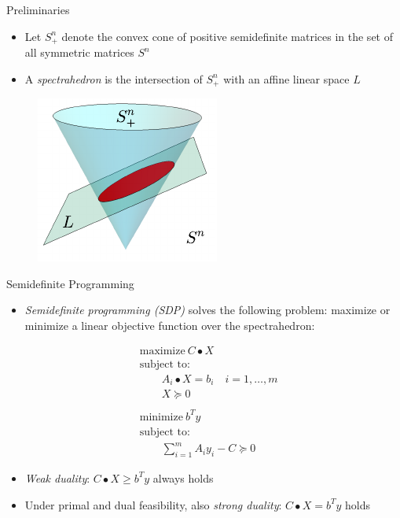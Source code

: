 \documentclass[10pt, xcolor={dvipsnames}]{beamer}
\DeclareMathOperator{\dotp}{{ \bullet }}
\begin{document}
\begin{frame}{Preliminaries}
\begin{itemize}
\item Let $S^{n}_{+}$ denote the convex cone of positive semidefinite matrices in the set of all symmetric matrices $S^{n}$ 
\item A {\it \color{red} spectrahedron} is the intersection of $S^{n}_{+}$ with an affine linear space $L$
\end{itemize}
\vspace{0.5cm}
\begin{center}
\begin{figure}
\includegraphics[width=.44\textwidth]{../figures/cone-crop.pdf}
\end{figure}
\end{center}
\end{frame}

\begin{frame}{Semidefinite Programming}
\begin{itemize}
\item {\it Semidefinite programming (SDP)} solves the following problem: maximize or minimize a linear objective function over the spectrahedron:
\end{itemize}
\begin{align}
& \text{maximize} \ C \dotp X \nonumber\\
& \text{subject to: } \label{eq: P} \tag{P}\\
& \qquad A_{i} \dotp X  = b_{i} \quad i = 1, \dots, m \nonumber\\
& \qquad X \succeq 0 \nonumber\\
\nonumber\\
& \text{minimize} \ b^{T}y \nonumber\\
& \text{subject to: } \label{eq: P} \tag{D}\\
& \qquad \sum_{i=1}^{m} A_{i} y_{i} - C \succeq 0 \nonumber
\end{align}

\begin{itemize}
\item {\it Weak duality}: $C \dotp X \geq b^{T} y$ always holds 
\item Under primal and dual feasibility, also {\it strong duality}: $C \dotp X = b^{T} y$ holds
\end{itemize}

\end{frame}
\end{document}
